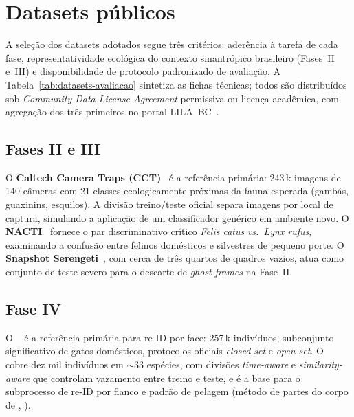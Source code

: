 \section{Datasets públicos}
\label{sec:metodologia-datasets}

A seleção dos datasets adotados segue três critérios: aderência à tarefa de cada fase, representatividade ecológica do contexto sinantrópico brasileiro (Fases~II e~III) e disponibilidade de protocolo padronizado de avaliação. A Tabela~\ref{tab:datasets-avaliacao} sintetiza as fichas técnicas; todos são distribuídos sob \emph{Community Data License Agreement} permissiva ou licença acadêmica, com agregação dos três primeiros no portal LILA~BC~\cite{lila_bc}.



\subsection*{Fases II e III}
O \textbf{Caltech Camera Traps (CCT)}~\cite{beery2018terra} é a referência primária: 243\,k imagens de 140 câmeras com 21 classes ecologicamente próximas da fauna esperada (gambás, guaxinins, esquilos). A divisão treino/teste oficial separa imagens por local de captura, simulando a aplicação de um classificador genérico em ambiente novo. O \textbf{NACTI}~\cite{tabak2019nacti} fornece o par discriminativo crítico \emph{Felis catus} \emph{vs.}\ \emph{Lynx rufus}, examinando a confusão entre felinos domésticos e silvestres de pequeno porte. O \textbf{Snapshot Serengeti}~\cite{norouzzadeh2018automatically}, com cerca de três quartos de quadros vazios, atua como conjunto de teste severo para o descarte de \emph{ghost frames} na Fase~II.

\subsection*{Fase IV}
O \textbf{\modeloPetFace}~\cite{shinoda2024petface} é a referência primária para re-ID por face: 257\,k indivíduos, subconjunto significativo de gatos domésticos, protocolos oficiais \emph{closed-set} e \emph{open-set}. O \textbf{\modeloWildlife}~\cite{adam2024wildlifereid10k} cobre dez mil indivíduos em $\sim$33 espécies, com divisões \emph{time-aware} e \emph{similarity-aware} que controlam vazamento entre treino e teste, e é a base para o subprocesso de re-ID por flanco e padrão de pelagem (método de partes do corpo de \citeauthor{akbar2025bodypart}, \citeyear{akbar2025bodypart}).

